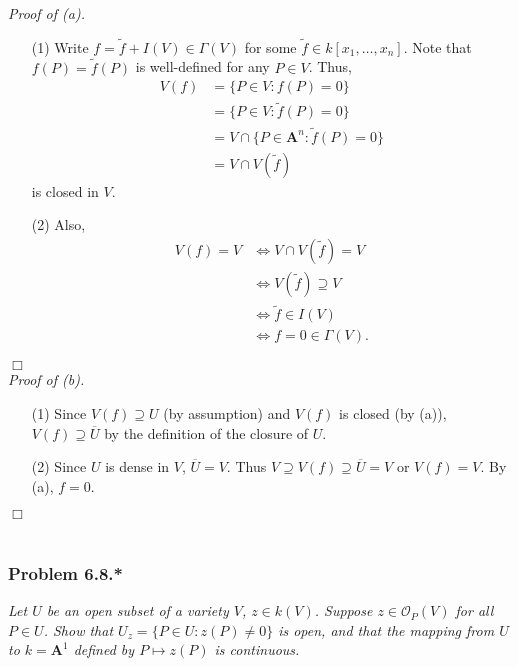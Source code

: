 \documentclass{article}
\begin{document}
\emph{Proof of (a).}
\begin{enumerate}
\item[(1)]
  Write $f = \widetilde{f} + I(V) \in \Gamma(V)$ for some $\widetilde{f} \in k[x_1,\ldots,x_n]$.
  Note that $f(P) = \widetilde{f}(P)$ is well-defined for any $P \in V$.
  Thus,
  \begin{align*}
    V(f)
    &= \{ P \in V : f(P) = 0 \} \\
    &= \{ P \in V : \widetilde{f}(P) = 0 \} \\
    &= V \cap \{ P \in \mathbf{A}^{n} : \widetilde{f}(P) = 0 \} \\
    &= V \cap V(\widetilde{f})
  \end{align*}
  is closed in $V$.

\item[(2)]
  Also,
  \begin{align*}
    V(f) = V
    &\Longleftrightarrow
    V \cap V(\widetilde{f}) = V \\
    &\Longleftrightarrow
    V(\widetilde{f}) \supseteq V \\
    &\Longleftrightarrow
    \widetilde{f} \in I(V) \\
    &\Longleftrightarrow
    f = 0 \in \Gamma(V).
  \end{align*}
\end{enumerate}
$\Box$ \\



\emph{Proof of (b).}
\begin{enumerate}
\item[(1)]
  Since $V(f) \supseteq U$ (by assumption) and $V(f)$ is closed (by (a)),
  $V(f) \supseteq \overline{U}$ by the definition of the closure of $U$.

\item[(2)]
  Since $U$ is dense in $V$, $\overline{U} = V$.
  Thus $V \supseteq V(f) \supseteq \overline{U} = V$ or $V(f) = V$.
  By (a), $f = 0$.
\end{enumerate}
$\Box$ \\\\






\subsubsection*{Problem 6.8.*}
\emph{Let $U$ be an open subset of a variety $V$, $z \in k(V)$.
Suppose $z \in \mathscr{O}_P(V)$ for all $P \in U$.
Show that $U_z = \{ P \in U : z(P) \neq 0 \}$ is open,
and that the mapping from $U$ to $k = \mathbf{A}^{1}$ defined by $P \mapsto z(P)$ is continuous.} \\
\end{document}
